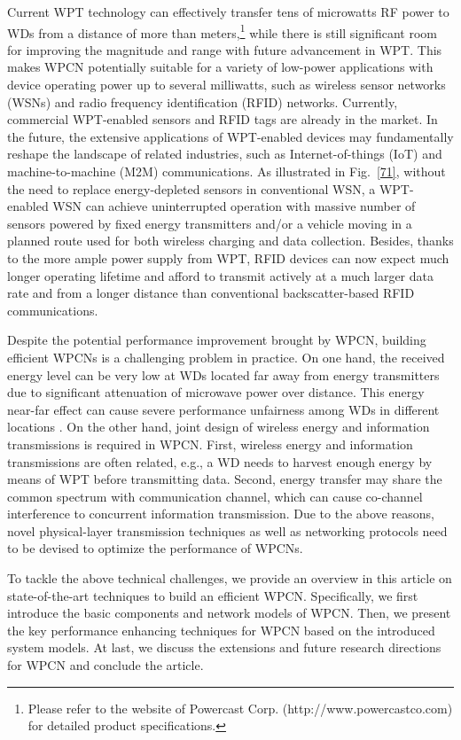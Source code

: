 \documentclass[journal, draftcls, one column, 12pt]{IEEEtran}
\begin{document}
Current WPT technology can effectively transfer tens of microwatts RF power to WDs from a distance of more than  meters,\footnote{Please refer to the website of Powercast Corp. (http://www.powercastco.com) for detailed product specifications.} while there is still significant room for improving the magnitude and range with future advancement in WPT. This makes WPCN potentially suitable for a variety of low-power applications with device operating power up to several milliwatts, such as wireless sensor networks (WSNs) and radio frequency identification (RFID) networks. Currently, commercial WPT-enabled sensors and RFID tags are already in the market. In the future, the extensive applications of WPT-enabled devices may fundamentally reshape the landscape of related industries, such as Internet-of-things (IoT) and machine-to-machine (M2M) communications. As illustrated in Fig.~\ref{71}, without the need to replace energy-depleted sensors in conventional WSN, a WPT-enabled WSN can achieve uninterrupted operation with massive number of sensors powered by fixed energy transmitters and/or a vehicle moving in a planned route used for both wireless charging and data collection. Besides, thanks to the more ample power supply from WPT, RFID devices can now expect much longer operating lifetime and afford to transmit actively at a much larger data rate and from a longer distance than conventional backscatter-based RFID communications.

Despite the potential performance improvement brought by WPCN, building efficient WPCNs is a challenging problem in practice. On one hand, the received energy level can be very low at WDs located far away from energy transmitters due to significant attenuation of microwave power over distance. This energy near-far effect can cause severe performance unfairness among WDs in different locations \cite{2014:Ju}. On the other hand, joint design of wireless energy and information transmissions is required in WPCN. First, wireless energy and information transmissions are often related, e.g., a WD needs to harvest enough energy by means of WPT before transmitting data. Second, energy transfer may share the common spectrum with communication channel, which can cause co-channel interference to concurrent information transmission. Due to the above reasons, novel physical-layer transmission techniques as well as networking protocols need to be devised to optimize the performance of WPCNs.

To tackle the above technical challenges, we provide an overview in this article on state-of-the-art techniques to build an efficient WPCN. Specifically, we first introduce the basic components and network models of WPCN. Then, we present the key performance enhancing techniques for WPCN based on the introduced system models. At last, we discuss the extensions and future research directions for WPCN and conclude the article.
\end{document}
